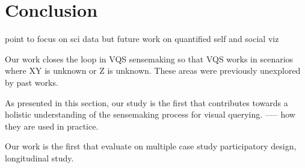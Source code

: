 \section{Conclusion\label{sec:conclusion}}
point to focus on sci data but future work on quantified self and social viz


Our work closes the loop in VQS sensemaking so that VQS works in scenarios  where XY is unknown or Z is unknown. These areas were previously unexplored by past works.

As presented in this section, our study is the first that contributes towards a holistic understanding of the sensemaking process for visual querying.
----- how they are used in practice. %

Our work is the first that evaluate on multiple case study participatory design, longitudinal study. 
